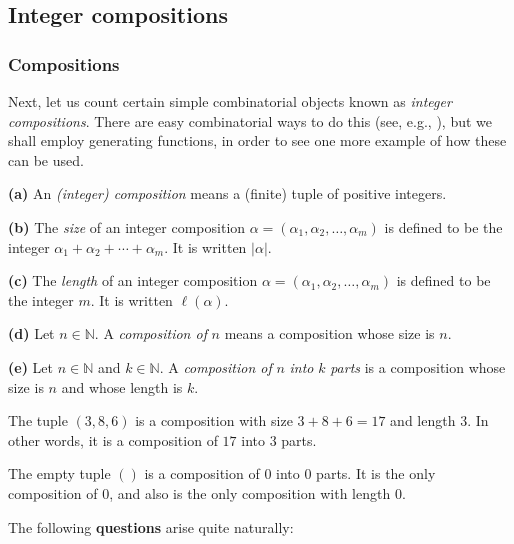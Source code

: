 \subsection{\label{sec.fps.intcomps}Integer compositions}

\subsubsection{Compositions}

Next, let us count certain simple combinatorial objects known as \emph{integer
compositions}. There are easy combinatorial ways to do this (see, e.g.,
\cite[\S 2.10.1]{19fco}), but we shall employ generating functions, in order
to see one more example of how these can be used.

\begin{definition}
\label{def.fps.comps}\textbf{(a)} An \emph{(integer) composition} means a
(finite) tuple of positive integers. \medskip

\textbf{(b)} The \emph{size} of an integer composition $\alpha=\left(
\alpha_{1},\alpha_{2},\ldots,\alpha_{m}\right)  $ is defined to be the integer
$\alpha_{1}+\alpha_{2}+\cdots+\alpha_{m}$. It is written $\left\vert
\alpha\right\vert $. \medskip

\textbf{(c)} The \emph{length} of an integer composition $\alpha=\left(
\alpha_{1},\alpha_{2},\ldots,\alpha_{m}\right)  $ is defined to be the integer
$m$. It is written $\ell\left(  \alpha\right)  $. \medskip

\textbf{(d)} Let $n\in\mathbb{N}$. A \emph{composition of }$n$ means a
composition whose size is $n$. \medskip

\textbf{(e)} Let $n\in\mathbb{N}$ and $k\in\mathbb{N}$. A \emph{composition of
}$n$\emph{ into }$k$\emph{ parts} is a composition whose size is $n$ and whose
length is $k$.
\end{definition}

\begin{example}
\label{exa.fps.comps.1}The tuple $\left(  3,8,6\right)  $ is a composition
with size $3+8+6=17$ and length $3$. In other words, it is a composition of
$17$ into $3$ parts.

The empty tuple $\left(  {}\right)  $ is a composition of $0$ into $0$ parts.
It is the only composition of $0$, and also is the only composition with
length $0$.
\end{example}

The following \textbf{questions} arise quite naturally:

